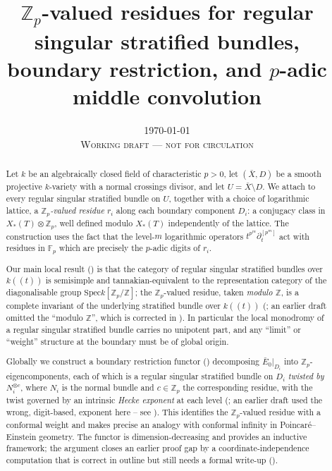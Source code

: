\documentclass[11pt,reqno]{amsart}
\newcommand{\Zp}{\mathbb{Z}_p}
\newcommand{\Fp}{\mathbb{F}_p}
\newcommand{\ZZ}{\mathbb{Z}}
\newcommand{\Spec}{\mathrm{Spec}}
\newcommand{\Xst}{X_*(T)}
\theoremstyle{plain}
\theoremstyle{definition}
\theoremstyle{remark}
\numberwithin{equation}{section}
\begin{document}
\title[$\Zp$-valued residues]{$\Zp$-valued residues for regular singular
stratified bundles, boundary restriction, and $p$-adic middle convolution}

\author{}
\address{}
\email{}

\date{\today\\ \textsc{Working draft --- not for circulation}}

\begin{abstract}
Let $k$ be an algebraically closed field of characteristic $p>0$, let
$(\bar X,D)$ be a smooth projective $k$-variety with a normal crossings
divisor, and let $U=\bar X\setminus D$.  We attach to every regular
singular stratified bundle on $U$, together with a choice of logarithmic
lattice, a \emph{$\Zp$-valued residue} $r_i$ along each boundary component
$D_i$: a conjugacy class in $\Xst\otimes\Zp$, well defined modulo $\Xst$
independently of the lattice.  The construction uses the fact that the
level-$m$ logarithmic operators $t^{p^m}\partial_t^{[p^m]}$ act with
residues in $\Fp$ which are precisely the $p$-adic digits of $r_i$.

Our main local result () is that the category of
regular singular stratified bundles over $k((t))$ is semisimple and
tannakian-equivalent to the representation category of the diagonalisable
group $\Spec k[\Zp/\ZZ]$; the $\Zp$-valued residue, taken \emph{modulo
$\ZZ$}, is a complete invariant of the underlying stratified bundle over
$k((t))$ (; an earlier draft omitted the ``modulo
$\ZZ$'', which is corrected in ).  In particular the
local monodromy of a regular singular stratified bundle carries no
unipotent part, and any ``limit'' or ``weight'' structure at the boundary
must be of global origin.

Globally we construct a boundary restriction functor
() decomposing $\bar E_0|_{D_i}$ into $\Zp$-eigen\-com\-po\-nents,
each of which is a regular singular stratified bundle on $D_i$
\emph{twisted by $N_i^{\otimes c}$}, where $N_i$ is the normal bundle and
$c\in\Zp$ the corresponding residue, with the twist governed by an
intrinsic \emph{Hecke exponent} at each level (; an
earlier draft used the wrong, digit-based, exponent here -- see
).  This identifies the $\Zp$-valued residue with a
conformal weight and makes precise an analogy with conformal infinity in
Poincar\'e--Einstein geometry.  The functor is dimension-decreasing and
provides an inductive framework; the argument closes an earlier proof gap
by a coordinate-independence computation that is correct in outline but
still needs a formal write-up ().


\end{abstract}
\end{document}
